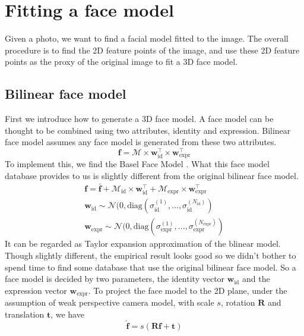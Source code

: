 
\section{Fitting a face model}
Given a photo, we want to find a facial model fitted to the image. The overall procedure is to find the 2D feature points of the image, and use these 2D feature points as the proxy of the original image to fit a 3D face model.

\subsection{Bilinear face model}
First we introduce how to generate a 3D face model. A face model can be thought to be combined using two attributes, identity and expression. Bilinear face model \cite{vlasic2005face} assumes any face model is generated from these two attributes. 
$$\mathbf{f} = \mathcal{M} \times \mathbf{w}_{\text{id}}^\top \times \mathbf{w}_{\text{expr}}^\top$$
To implement this, we find the Basel Face Model \cite{gerig2017morphable}. What this face model database provides to us is slightly different from the original bilinear face model. 
\begin{align*}
\mathbf{f} = \bar{\mathbf{f}} + \mathcal{M}_{\text{id}} \times \mathbf{w}_{\text{id}}^\top + \mathcal{M}_{\text{expr}}\times \mathbf{w}_{\text{expr}}^\top \\
\mathbf{w}_{\text{id}} \sim \mathcal{N}(0, \text{diag}(\sigma_{\text{id}}^{(1)}, \dots, \sigma_{\text{id}}^{(N_\text{id})}) \\ 
\mathbf{w}_{\text{expr}} \sim \mathcal{N}(0, \text{diag}(\sigma_{\text{expr}}^{(1)}, \dots, \sigma_{\text{expr}}^{(N_\text{expr})})
\end{align*}
It can be regarded as Taylor expansion approximation of the blinear model. Though slightly different, the empirical result looks good so we didn't bother to spend time to find some database that use the original bilinear face model.
So a face model is decided by two parameters, the identity vector $\mathbf{w}_{\text{id}}$ and the expression vector $\mathbf{w}_{\text{expr}}$. To project the face model to the 2D plane, under the assumption of weak perspective camera model, with scale $s$, rotation $\mathbf{R}$ and translation $\mathbf{t}$, we have 
$$\hat{\mathbf{f}} = s (\mathbf{R} \mathbf{f} + \mathbf{t})$$

